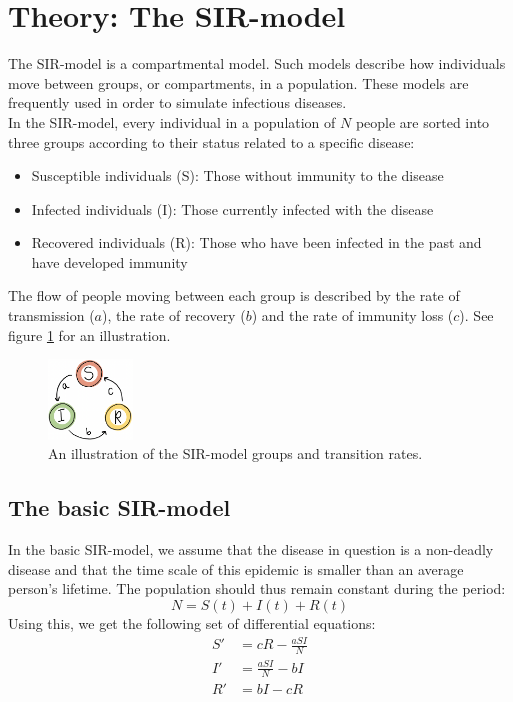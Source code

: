 \documentclass[notitlepage, reprint, nofootinbib]{revtex4-1}
\begin{document}
\section{Theory: The SIR-model}
The SIR-model is a compartmental model. Such models describe how individuals move between groups, or compartments, in a population. These models are frequently used in order to simulate infectious diseases. \\[2mm]
In the SIR-model, every individual in a population of $N$ people are sorted into three groups according to their status related to a specific disease: 
\begin{itemize}
	\item Susceptible individuals (S): Those without immunity to the disease
	\item Infected individuals (I): Those currently infected with the disease 
	\item Recovered individuals (R): Those who have been infected in the past and have developed immunity 
\end{itemize}
The flow of people moving between each group is described by the rate of transmission ($a$), the rate of recovery ($b$) and the rate of immunity loss ($c$). See figure \ref{sketch} for an illustration. 
\begin{figure}[h!]
	\centering
	\includegraphics[width=0.2\textwidth]{../Figures/SIR-model_illustration.png}
	\caption{An illustration of the SIR-model groups and transition rates.}
	\label{sketch}
\end{figure}
\subsection{The basic SIR-model}
In the basic SIR-model, we assume that the disease in question is a non-deadly disease and that the time scale of this epidemic is smaller than an average person's lifetime. The population should thus remain constant during the period:	
\begin{equation}\label{SIR-eq}N=S(t)+I(t)+R(t)\end{equation}
Using this, we get the following set of differential equations:
\begin{align}
	S' &= cR-\frac{aSI}{N}\label{SIR1_S}\\
	I' &= \frac{aSI}{N}-bI\label{SIR1_I}\\
	R' &= bI - cR \label{SIR1_R}
\end{align}
\newpage
\end{document}

